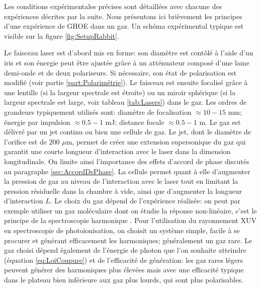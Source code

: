 Les conditions expérimentales précises sont détaillées avec chacune des expériences décrites par la suite. Nous présentons ici brièvement les principes d'une expérience de GHOE dans un gaz. Un schéma expérimental typique est visible sur la figure \ref{fig:SetupRabbit}.

Le faisceau laser est d'abord mis en forme: son diamètre est contôlé à l'aide d'un iris et son énergie peut être ajustée grâce à un atténuateur composé d'une lame demi-onde et de deux polariseurs. Si nécessaire, son état de polarisation est modifié (voir partie \ref{part:Polarimétrie}). Le faisceau est ensuite focalisé grâce à une lentille (si la largeur spectrale est étroite) ou un miroir sphérique (si la largeur spectrale est large, voir tableau \ref{tab:Lasers}) dans le gaz. Les ordres de grandeurs typiquement utilisés sont: diamètre de focalisation $\approx 10 - 15$ mm; énergie par impulsion $\approx 0.5 - 1$ mJ; distance focale $\approx 0.5 - 1$ m. Le gaz est délivré par un jet continu ou bien une cellule de gaz. Le jet, dont le diamètre de l'orifice est de 200 $\mu$m, permet de créer une extension supersonique du gaz qui garantit une courte longueur d'interaction avec le laser dans la dimension longitudinale. On limite ainsi l'importance des effets d'accord de phase discutés au paragraphe \ref{sec:AccordDePhase}. La cellule permet quant à elle d'augmenter la pression de gaz au niveau de l'interaction avec le laser tout en limitant la pression résiduelle dans la chambre à vide, ainsi que d'augmenter la longueur d'interaction $L$. Le choix du gaz dépend de l'expérience réalisée: on peut par exemple utiliser un gaz moléculaire dont on étudie la réponse non-linéaire, c'est le principe de la spectroscopie harmonique . Pour l'utilisation du rayonnement XUV en spectroscopie de photoionisation, on choisit un système simple, facile à se procurer et générant efficacement les harmoniques; généralement un gaz rare. Le gaz choisi dépend également de l'énergie de photon que l'on souhaite atteindre (équation \ref{eq:LoiCoupure}) et de l'efficacité de génération: les gaz rares légers peuvent générer des harmoniques plus élevées mais avec une efficacité typique dans le plateau bien inférieure aux gaz plus lourds, qui sont plus polarisables.


